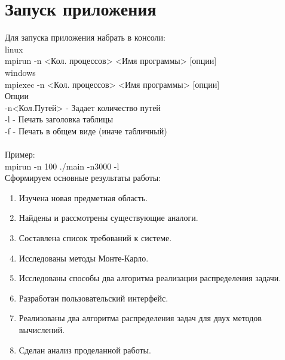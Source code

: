 \section{Запуск приложения}
Для запуска приложения набрать в консоли:\\
linux\\
	mpirun -n <Кол. процессов> <Имя программы> [опции]\\
windows\\
	mpiexec -n <Кол. процессов> <Имя программы> [опции]\\
Опции\\
-n<Кол.Путей> - Задает количество путей\\
-l  - Печать заголовка таблицы\\
-f - Печать в общем виде (иначе табличный)\\
\\
Пример:\\
	mpirun -n 100 ./main -n3000 -l\\
\newpage{}
 Сформируем основные результаты работы:
 \begin{enumerate}
	\item Изучена новая предметная область. 
	\item Найдены и рассмотрены существующие аналоги.
	\item Составлена список требований к системе.
	\item Исследованы методы Монте-Карло.
	\item Исследованы способы два алгоритма реализации распределения задачи.
	\item Разработан пользовательский интерфейс.
	\item Реализованы два алгоритма распределения задач для двух методов вычислений. 
	\item Сделан анализ проделанной работы.
\end{enumerate}
